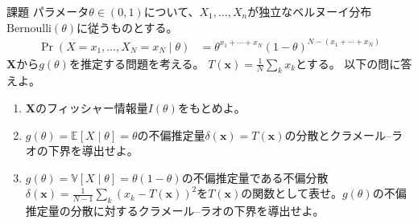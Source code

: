 \documentclass[lualatex,handout]{beamer}
\newcommand{\expt}[1]{\mathbb{E}\left[#1\right]}
\newcommand{\var}[1]{\mathbb{V}\left[#1\right]}
\theoremstyle{definition}
\begin{document}
\begin{frame}{課題}
\small
パラメータ$\theta\in(0,1)$について、$X_1,\dotsc,X_n$が独立なベルヌーイ分布$\mathrm{Bernoulli}(\theta)$に従うものとする。
\begin{align*}
\Pr(X=x_1,\dotsc,X_N=x_N\mid\theta)&=\theta^{x_1+\dotsb+x_N}(1-\theta)^{N-(x_1+\dotsb+x_N)}
\end{align*}
$\symbf{X}$から$g(\theta)$を推定する問題を考える。
$T(\symbf{x})=\frac1N\sum_kx_k$とする。
以下の問に答えよ。

\vspace{1em}
\begin{enumerate}
\setlength{\itemsep}{2em}
\item $\symbf{X}$のフィッシャー情報量$I(\theta)$をもとめよ。
\item $g(\theta)=\expt{X\mid\theta}=\theta$の不偏推定量$\delta(\symbf{x})=T(\symbf{x})$の分散とクラメール--ラオの下界を導出せよ。
\item $g(\theta)=\var{X\mid\theta}=\theta(1-\theta)$の不偏推定量である不偏分散$\delta(\symbf{x})=\frac1{N-1}\sum_k(x_k-T(\symbf{x}))^2$を$T(\symbf{x})$の関数として表せ。$g(\theta)$の不偏推定量の分散に対するクラメール--ラオの下界を導出せよ。
\end{enumerate}
\end{frame}
\end{document}
